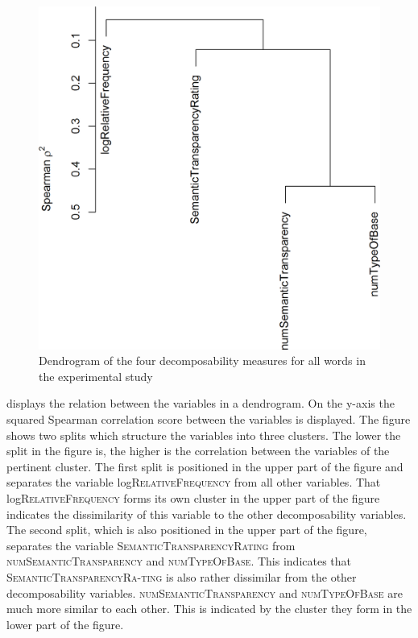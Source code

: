  \begin{figure}
 	\vspace*{\baselineskip} 
 	\includegraphics[scale=0.5]{images/Experiment/clusterAnalysisDecomposabilityExperimentAllTokens.png}
 	\caption{Dendrogram of the four decomposability measures for all words in the experimental study}
 	\label{fig:cluster experiment all affixes}
 \end{figure}
 
 displays the relation between the variables in a dendrogram. On the y-axis the squared Spearman correlation score between the variables is displayed. 
The figure shows two splits which structure the variables into three clusters. The lower the split in the figure is, the higher is the correlation between the variables of the pertinent cluster.
The first split is positioned in the upper part of the figure and separates the  variable log\textsc{RelativeFrequency} from all other variables. That log\textsc{RelativeFrequency} forms its own cluster in the upper part of the figure indicates the dissimilarity of this variable to the other decomposability variables. 
The second split, which is also positioned in the upper part of the figure, separates the variable \textsc{SemanticTransparencyRating} from \textsc{numSemanticTransparency} and \textsc{numTypeOfBase}. This indicates that \textsc{SemanticTransparencyRa-ting} is also rather dissimilar from the other decomposability variables. 
\textsc{numSemanticTransparency} and \textsc{numTypeOfBase} are much more similar to each other. This is indicated by the cluster they form in the lower part of the figure. 

